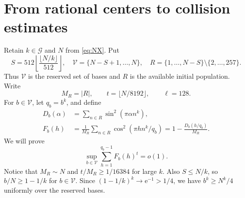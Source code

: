 \documentclass[11pt]{amsart}
\numberwithin{equation}{section}
\theoremstyle{remark}
\newcommand{\e}{\mathrm e}
\begin{document}
\section{From rational centers to collision estimates}\label{sec:collision}

Retain \(k\in\mathcal G\) and \(N\) from \eqref{eq:NX}. Put
\[
 S=512\left\lfloor\frac{\lfloor N/k\rfloor}{512}\right\rfloor,\quad
 \mathcal V=\{N-S+1,\ldots,N\},\quad
 R=\{1,\ldots,N-S\}\setminus\{2,\ldots,257\}.
\]
Thus \(\mathcal V\) is the reserved set of bases and \(R\) is the available
initial population. Write
\[
 M_R=|R|,\qquad t=\lfloor N/8192\rfloor,\qquad \ell=128.
\]
For \(b\in\mathcal V\), let \(q_b=b^k\), and define
\begin{align*}
 D_b(\alpha)&=\sum_{n\in R}\sin^2(\pi\alpha n^k),\\
 F_b(h)&=\frac1{M_R}\sum_{n\in R}
           \cos^2(\pi hn^k/q_b)
       =1-\frac{D_b(h/q_b)}{M_R}.
\end{align*}
We will prove
\begin{equation}\label{eq:collision}
 \sup_{b\in\mathcal V}\sum_{h=1}^{q_b-1}F_b(h)^t=o(1).
\end{equation}
Notice that \(M_R\sim N\) and \(t/M_R\ge1/16384\) for large \(k\).
Also \(S\le N/k\), so \(b/N\ge1-1/k\) for \(b\in\mathcal V\).
Since \((1-1/k)^k\to\e^{-1}>1/4\), we have
\(b^k\ge N^k/4\) uniformly over the reserved bases.
\end{document}

